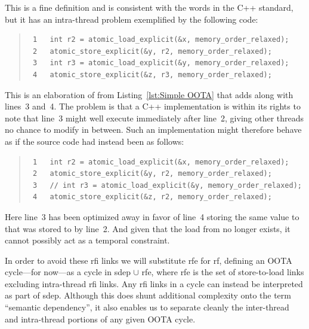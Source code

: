\documentclass[10]{article}
\begin{document}
This is a fine definition and is consistent with the words in the C++
standard, but it has an intra-thread problem exemplified by the following
code:
\begin{quote}
\scriptsize
\begin{verbatim}
 1   int r2 = atomic_load_explicit(&x, memory_order_relaxed);
 2   atomic_store_explicit(&y, r2, memory_order_relaxed);
 3   int r3 = atomic_load_explicit(&y, memory_order_relaxed);
 4   atomic_store_explicit(&z, r3, memory_order_relaxed);
\end{verbatim}
\end{quote}
This is an elaboration of  from
Listing~\ref{lst:Simple OOTA}
that adds  along with lines~3 and~4.
The problem is that a C++ implementation is within its rights to
note that line~3 might well execute immediately after line~2, giving
other threads no chance to modify  in between.
Such an implementation might therefore behave as if the source code
had instead been as follows:
\begin{quote}
\scriptsize
\begin{verbatim}
 1   int r2 = atomic_load_explicit(&x, memory_order_relaxed);
 2   atomic_store_explicit(&y, r2, memory_order_relaxed);
 3   // int r3 = atomic_load_explicit(&y, memory_order_relaxed);
 4   atomic_store_explicit(&z, r2, memory_order_relaxed);
\end{verbatim}
\end{quote}
Here line~3 has been optimized away in favor of line~4 storing the same value
to  that was stored to  by line~2.
And given that the load from  no longer exists, it cannot possibly
act as a temporal constraint.

In order to avoid these rfi links we will substitute rfe
for rf, defining an OOTA cycle---for now---as a cycle in sdep $\cup$ rfe,
where rfe is the set of store-to-load links excluding intra-thread rfi links.
Any rfi links in a cycle can instead be interpreted as part of sdep.
Although this does shunt additional complexity onto the term
``semantic dependency'', it also enables us to separate cleanly
the inter-thread and intra-thread portions of any given OOTA cycle.

\end{document}
